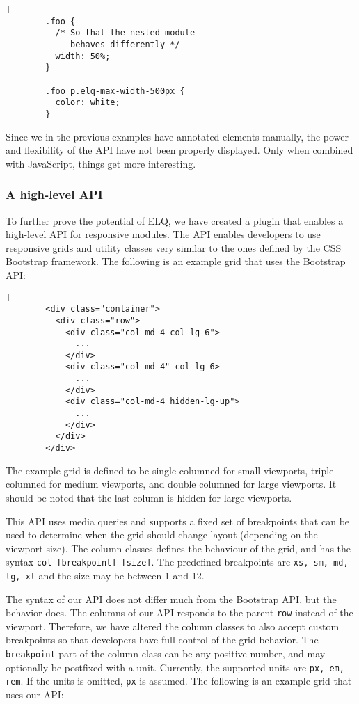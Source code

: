\documentclass{acm_proc_article-sp}
\newcommand{\code}[1]{\texttt{#1}}
\newcommand{\elq}{ELQ}
\begin{document}
      \begin{lstlisting}[gobble=8,caption={},captionpos=b,label={code:elq-mirror-example-css}]]
        .foo {
          /* So that the nested module 
             behaves differently */
          width: 50%;
        }

        .foo p.elq-max-width-500px {
          color: white;
        }
      \end{lstlisting}

      Since we in the previous examples have annotated elements manually, the power and flexibility of the API have not been properly displayed.
      Only when combined with JavaScript, things get more interesting.

    \subsubsection{A high-level API}
      To further prove the potential of \elq{}, we have created a plugin that enables a high-level API for responsive modules.
      The API enables developers to use responsive grids and utility classes very similar to the ones defined by the CSS Bootstrap framework.
      The following is an example grid that uses the Bootstrap API:

      \begin{lstlisting}[gobble=8,caption={},captionpos=b,label={code:bootstrap-grid-example}]]
        <div class="container">
          <div class="row">
            <div class="col-md-4 col-lg-6">
              ...
            </div>
            <div class="col-md-4" col-lg-6>
              ...
            </div>
            <div class="col-md-4 hidden-lg-up">
              ...
            </div>
          </div>
        </div>
      \end{lstlisting}

      The example grid is defined to be single columned for small viewports, triple columned for medium viewports, and double columned for large viewports.
      It should be noted that the last column is hidden for large viewports.
      
      This API uses media queries and supports a fixed set of breakpoints that can be used to determine when the grid should change layout (depending on the viewport size).
      The column classes defines the behaviour of the grid, and has the syntax \code{col-[breakpoint]-[size]}.
      The predefined breakpoints are \code{xs, sm, md, lg, xl} and the size may be between 1 and 12.

      The syntax of our API does not differ much from the Bootstrap API, but the behavior does.
      The columns of our API responds to the parent \code{row} instead of the viewport.
      Therefore, we have altered the column classes to also accept custom breakpoints so that developers have full control of the grid behavior.
      The \code{breakpoint} part of the column class can be any positive number, and may optionally be postfixed with a unit.
      Currently, the supported units are \code{px, em, rem}.
      If the units is omitted, \code{px} is assumed.
      The following is an example grid that uses our API:
\end{document}
